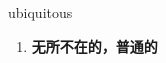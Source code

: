
\begin{frame}
{\huge ubiquitous}
\begin{center}
\begin{enumerate}\Large
  \item \textbf{无所不在的，普通的}
\end{enumerate}
\end{center}
\end{frame}
